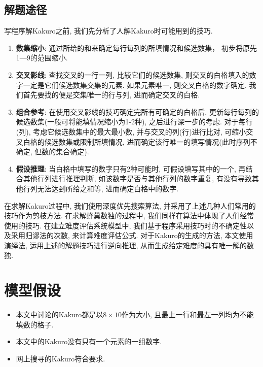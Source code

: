     \subsection{解题途径}
        写程序解Kakuro之前, 我们先分析了人解Kakuro时可能用到的技巧.
        \begin{enumerate}
            \item \textbf{数集缩小}: 通过所给的和来确定每行每列的所填情况和候选数集，
                    初步将原先1—9的范围缩小.\label{Skill1}
            \item \textbf{交叉影线}: 查找交叉的一行一列, 比较它们的候选数集,
                    则交叉的白格填入的数字一定是它们候选数集交集的元素.
                    如果元素唯一, 则交叉白格的数字确定.
                    我们首先要找的便是交集唯一的行与列, 进而确定交叉的白格.\label{Skill2}
            \item \textbf{组合参考}: 在使用交叉影线的技巧确定完所有可确定的白格后,
                    更新每行每列的候选数集(一般可将能填情况缩小为1-2种), 之后进行深一步的考虑.
                    对于每行(列), 考虑它候选数集中的最大最小数, 并与交叉的列(行)进行比对,
                    可缩小交叉白格的候选数集或限制所填情况, 进而确定该行唯一的填写情况(此时序列不确定,
                    但数的集合确定).\label{Skill3}
            \item \textbf{假设推理}: 当白格中填写的数字只有2种可能时,
                    可假设填写其中的一个, 再结合其他行列进行推理判断, 如该数字是否与其他行列的数字重复,
                    有没有导致其他行列无法达到所给之和等, 进而确定白格中的数字.\label{Skill4}
        \end{enumerate}

        在求解Kakuro过程中, 我们使用深度优先搜索算法,
        并采用了上述几种人们常用的技巧作为剪枝方法.
        在求解蜂巢数独的过程中, 我们同样在算法中体现了人们经常使用的技巧.
        在建立难度评估系统模型中, 我们基于程序采用技巧时的不确定性以及采用归谬法的次数,
        来计算难度评估公式.
        对于Kakuro的生成的方法, 本文使用演绎法, 运用上述的解题技巧进行逆向推理,
        从而生成给定难度的具有唯一解的数独.

\section{模型假设} %
    \begin{itemize}
        \item 本文中讨论的Kakuro都是以$8\times10$作为大小, 且最上一行和最左一列均为不能填数的格子.
        \item 本文中的Kakuro没有只有一个元素的一组数字.
        \item 网上搜寻的Kakuro符合要求.
    \end{itemize}
